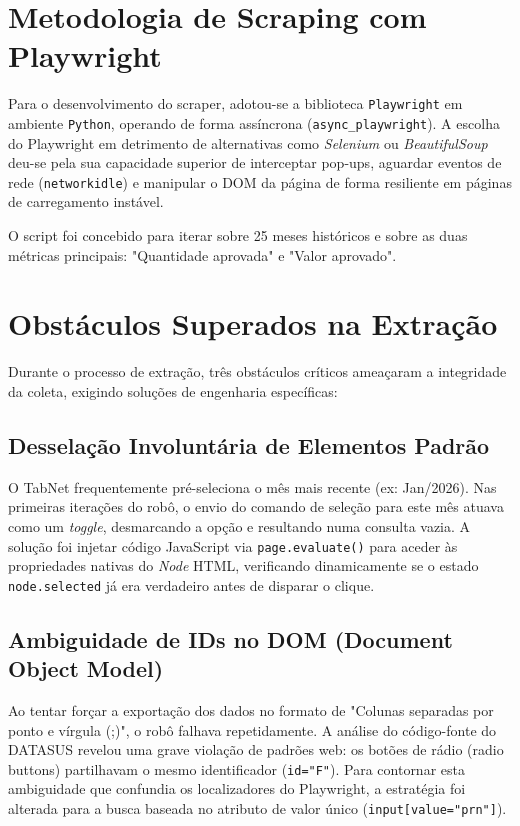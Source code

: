 \documentclass[12pt,a4paper]{report}
\begin{document}
\section{Metodologia de Scraping com Playwright}
Para o desenvolvimento do scraper, adotou-se a biblioteca \texttt{Playwright} em ambiente \texttt{Python}, operando de forma assíncrona (\texttt{async\_playwright}). A escolha do Playwright em detrimento de alternativas como \textit{Selenium} ou \textit{BeautifulSoup} deu-se pela sua capacidade superior de interceptar pop-ups, aguardar eventos de rede (\texttt{networkidle}) e manipular o DOM da página de forma resiliente em páginas de carregamento instável.

O script foi concebido para iterar sobre 25 meses históricos e sobre as duas métricas principais: "Quantidade aprovada" e "Valor aprovado".

\section{Obstáculos Superados na Extração}

Durante o processo de extração, três obstáculos críticos ameaçaram a integridade da coleta, exigindo soluções de engenharia específicas:

\subsection{Desselação Involuntária de Elementos Padrão}
O TabNet frequentemente pré-seleciona o mês mais recente (ex: Jan/2026). Nas primeiras iterações do robô, o envio do comando de seleção para este mês atuava como um \textit{toggle}, desmarcando a opção e resultando numa consulta vazia.
A solução foi injetar código JavaScript via \texttt{page.evaluate()} para aceder às propriedades nativas do \textit{Node} HTML, verificando dinamicamente se o estado \texttt{node.selected} já era verdadeiro antes de disparar o clique.

\subsection{Ambiguidade de IDs no DOM (Document Object Model)}
Ao tentar forçar a exportação dos dados no formato de "Colunas separadas por ponto e vírgula (;)", o robô falhava repetidamente. A análise do código-fonte do DATASUS revelou uma grave violação de padrões web: os botões de rádio (radio buttons) partilhavam o mesmo identificador (\texttt{id="F"}).
Para contornar esta ambiguidade que confundia os localizadores do Playwright, a estratégia foi alterada para a busca baseada no atributo de valor único (\texttt{input[value="prn"]}).
\end{document}
